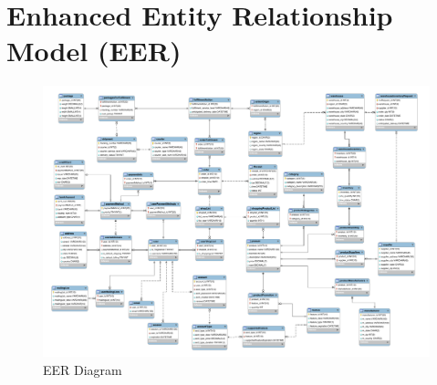 \pagebreak
\section{Enhanced Entity Relationship Model (EER)}
\begin{figure}[h!]
\centering
\includegraphics[scale= 0.511, angle=90]{EER.pdf}
\caption{EER Diagram}
\end{figure}

